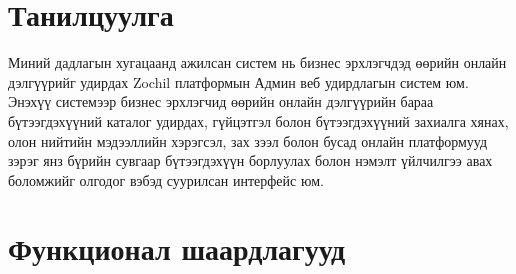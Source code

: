 \section{Танилцуулга}
Миний дадлагын хугацаанд ажилсан систем нь бизнес эрхлэгчдэд өөрийн онлайн дэлгүүрийг удирдах Zochil платформын Админ веб удирдлагын систем юм. Энэхүү системээр бизнес эрхлэгчид өөрийн онлайн дэлгүүрийн бараа бүтээгдэхүүний каталог удирдах, гүйцэтгэл болон бүтээгдэхүүний захиалга хянах, олон нийтийн мэдээллийн хэрэгсэл, зах зээл болон бусад онлайн платформууд зэрэг янз бүрийн сувгаар бүтээгдэхүүн борлуулах болон нэмэлт үйлчилгээ авах боломжийг олгодог вэбэд суурилсан интерфейс юм.

\section{Функционал шаардлагууд}
